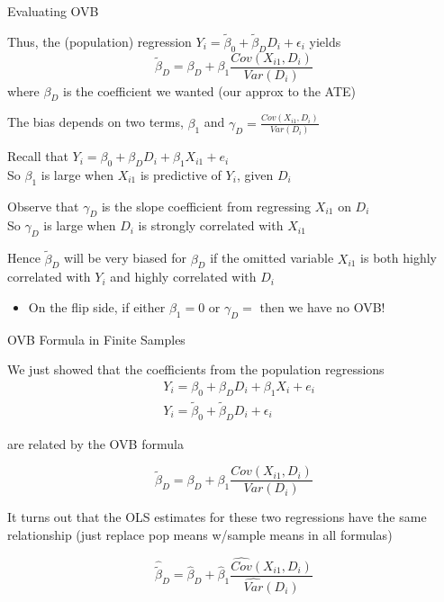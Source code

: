 \documentclass[11pt,english,handout]{beamer}
\newenvironment{wideitemize}{\itemize\addtolength{\itemsep}{10pt}}{\enditemize}
\begin{document}
\begin{frame}{Evaluating OVB}
	\begin{wideitemize}
		\item
		Thus, the (population) regression $Y_i = \tilde\beta_0 + \tilde\beta_D D_i + \epsilon_i$ yields
		$$\tilde{\beta}_D=\beta_D+\beta_1\frac{Cov(X_{i1},D_i)}{Var(D_i)}$$
		\noindent where $\beta_D$ is the coefficient we wanted (our approx to the ATE)
				
		\pause
		\item
		The bias depends on two terms, $\beta_1$ and $\gamma_D=\frac{Cov(X_{i1},D_i)}{Var(D_i)}$\\
		
		
		\pause
		\item
		Recall that $Y_i= \beta_0 + \beta_{D} D_i + \beta_{1} X_{i1} +e_i$ \\
		So $\beta_1$ is large when $X_{i1}$ is predictive of $Y_i$, given $D_i$
		
		\pause
		\item
		Observe that $\gamma_D$ is the slope coefficient from regressing $X_{i1}$ on $D_i$\\
		So $\gamma_D$ is large when $D_i$ is strongly correlated with $X_{i1}$	
		\pause
		\item
		Hence $\tilde\beta_D$ will be very biased for $\beta_D$ if the omitted variable $X_{i1}$ is both highly correlated with $Y_i$ and highly correlated with $D_i$\smallskip\pause{}
		\begin{itemize}
		\item On the flip side, if either $\beta_1=0$ or $\gamma_D=$ then we have no OVB!
		\end{itemize}
		
	\end{wideitemize}
	
\end{frame}


\begin{frame}{OVB Formula in Finite Samples}
	\begin{wideitemize}
		\item
		We just showed that the coefficients from the population regressions
		\begin{align}
		 & Y_i = \beta_0 + \beta_D D_i + \beta_1 X_i + e_i \\
		 & Y_i = \tilde\beta_0 + \tilde\beta_D D_i + \epsilon_i 
		\end{align}
	
	\noindent are related by the OVB formula
	
	$$\tilde{\beta}_D=\beta_D+\beta_1\frac{Cov(X_{i1},D_i)}{Var(D_i)}$$
	
	\pause
	\item
	It turns out that the OLS estimates for these two regressions have the same relationship (just replace pop means w/sample means in all formulas)
	
	$$\hat{\tilde{\beta}}_D= \hat{\beta}_D+ \hat{\beta}_1\frac{\widehat{Cov}(X_{i1},D_i)}{\widehat{Var}(D_i)}$$

	\end{wideitemize}
\end{frame}
\end{document}
